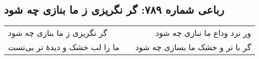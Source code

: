 \begin{center}
\section*{رباعی شماره ۷۸۹: گر نگریزی ز ما بنازی چه شود}
\label{sec:0789}
\begin{longtable}{l p{0.5cm} r}
گر نگریزی ز ما بنازی چه شود
&&
ور نرد وداع ما نبازی چه شود
\\
ما را لب خشک و دیدهٔ تر بی‌تست
&&
گر با تر و خشک ما بسازی چه شود
\\
\end{longtable}
\end{center}
